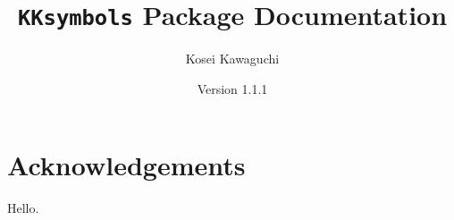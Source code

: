 \documentclass[luatex,fontsize=10pt,paper=b5]{jlreq}
\title{\texttt{KKsymbols} Package Documentation}
\author{Kosei Kawaguchi}
\date{Version 1.1.1}
\begin{document}
\begin{titlepage}
  \maketitle
\end{titlepage}
\newpage
\section{Acknowledgements}
Hello.
\end{document}
